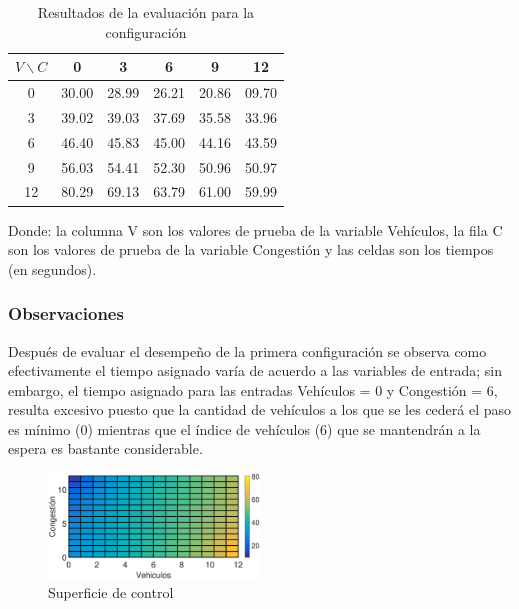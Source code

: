 \begin{table}[H]
	\centering
	\begin{tabular}{cccccc} \toprule
		$V \backslash C$ &  0 & 3 & 6 & 9 & 12 \\ \midrule
		0 & 30.00 & 28.99 & 26.21 & 20.86 & 09.70 \\
		3 & 39.02 & 39.03 & 37.69 & 35.58 & 33.96 \\
		6 & 46.40 & 45.83 & 45.00 & 44.16 & 43.59 \\
		9 & 56.03 & 54.41 & 52.30 & 50.96 & 50.97 \\
		12& 80.29 & 69.13 & 63.79 & 61.00 & 59.99 \\
	\end{tabular}
	\caption{Resultados de la evaluación para la configuración}
\end{table}
Donde: la columna V son los valores de prueba de la variable Vehículos, la fila C son los valores de  prueba de la variable Congestión y las celdas son los tiempos (en segundos).




\subsubsection{Observaciones}
\begin{multicols}{2}

Después de evaluar el desempeño de la primera configuración se observa como efectivamente el tiempo asignado varía de acuerdo a las variables de entrada; sin embargo, el tiempo asignado para las entradas Vehículos = 0 y Congestión = 6, resulta excesivo puesto que la cantidad de vehículos a los que se les cederá el paso es mínimo (0) mientras que el índice de vehículos (6) que se mantendrán a la espera es bastante considerable.

\begin{figure}[H]
	\includegraphics[width=0.5\textwidth]{Surfaces/Surface2D_A.eps}
	\caption{Superficie de control}
\end{figure}

\end{multicols}

